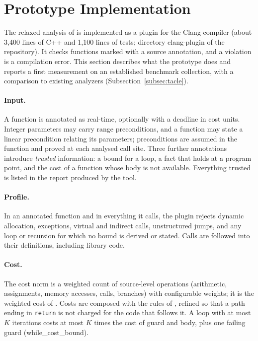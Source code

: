 \documentclass[oneside,english]{amsart}
\numberwithin{equation}{section}
\numberwithin{figure}{section}
\theoremstyle{plain}
\theoremstyle{definition}
\theoremstyle{plain}
\theoremstyle{remark}
\theoremstyle{plain}
\theoremstyle{definition}
\theoremstyle{plain}
\theoremstyle{remark}
\newcommand{\lean}[1]{{\ttfamily\small #1}}
\begin{document}
\section{Prototype Implementation}
\label{sec:implementation}

The relaxed analysis of \cite[Section~\ref{I-subsec:asymptotic-relaxation}]{crosscheckTheory} is implemented as a plugin for the Clang compiler (about 3{,}400 lines of C++ and 1{,}100 lines of tests; directory \lean{clang-plugin} of the repository). It checks functions marked with a source annotation, and a violation is a compilation error. This section describes what the prototype does and reports a first measurement on an established benchmark collection, with a comparison to existing analyzers (Subsection~\ref{subsec:tacle}).

\paragraph{Input.}
A function is annotated as real-time, optionally with a deadline in cost units. Integer parameters may carry range preconditions, and a function may state a linear precondition relating its parameters; preconditions are assumed in the function and proved at each analysed call site. Three further annotations introduce \emph{trusted} information: a bound for a loop, a fact that holds at a program point, and the cost of a function whose body is not available. Everything trusted is listed in the report produced by the tool.

\paragraph{Profile.}
In an annotated function and in everything it calls, the plugin rejects dynamic allocation, exceptions, virtual and indirect calls, unstructured jumps, and any loop or recursion for which no bound is derived or stated. Calls are followed into their definitions, including library code.

\paragraph{Cost.}
The cost norm is a weighted count of source-level operations (arithmetic, assignments, memory accesses, calls, branches) with configurable weights; it is the weighted cost of \cite[Definition~\ref{I-def:subadditive-norm}]{crosscheckTheory}. Costs are composed with the rules of \cite[Section~\ref{I-subsubsec:tropical-semiring}]{crosscheckTheory}, refined so that a path ending in \texttt{return} is not charged for the code that follows it. A loop with at most $K$ iterations costs at most $K$ times the cost of guard and body, plus one failing guard (\lean{while\_\allowbreak cost\_\allowbreak bound}).
\end{document}
